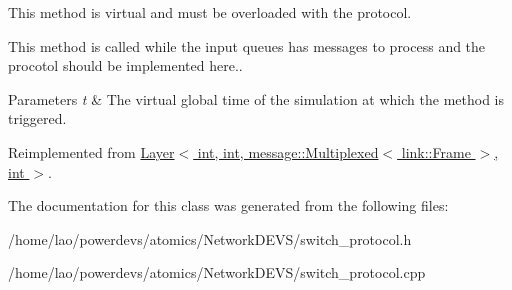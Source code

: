 This method is virtual and must be overloaded with the protocol. 

This method is called while the input queues has messages to process and the procotol should be implemented here..


\begin{DoxyParams}{Parameters}
{\em t} & The virtual global time of the simulation at which the method is triggered. \\
\hline
\end{DoxyParams}


Reimplemented from \hyperlink{classLayer_a1c82b14ba3efc37969f55c633a9b3173}{Layer$<$ int, int, message\+::\+Multiplexed$<$ link\+::\+Frame $>$, int $>$}.



The documentation for this class was generated from the following files\+:\begin{DoxyCompactItemize}
\item 
/home/lao/powerdevs/atomics/\+Network\+D\+E\+V\+S/switch\+\_\+protocol.\+h\item 
/home/lao/powerdevs/atomics/\+Network\+D\+E\+V\+S/switch\+\_\+protocol.\+cpp\end{DoxyCompactItemize}
